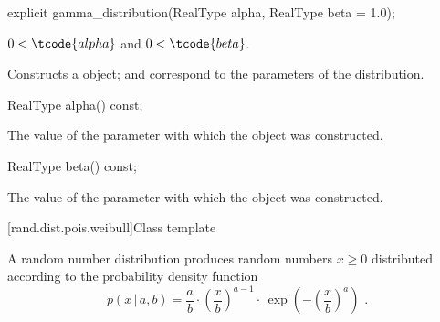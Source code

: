 %
\begin{itemdecl}
explicit gamma_distribution(RealType alpha, RealType beta = 1.0);
\end{itemdecl}

\begin{itemdescr}
\pnum
\requires $0 < \tcode{alpha}$ and $0 < \tcode{beta}$.

\pnum
\effects Constructs a  object;
 and 
correspond to the parameters of the distribution.
\end{itemdescr}

%
\begin{itemdecl}
RealType alpha() const;
\end{itemdecl}

\begin{itemdescr}
\pnum\returns The value of the  parameter
 with which the object was constructed.
\end{itemdescr}

%
\begin{itemdecl}
RealType beta() const;
\end{itemdecl}

\begin{itemdescr}
\pnum\returns The value of the  parameter
 with which the object was constructed.
\end{itemdescr}


[rand.dist.pois.weibull]{Class template }%
%
%

\pnum
A  random number distribution
produces random numbers $x \geq 0$
distributed according to
the probability density function%
%
%
\[ p(x\,|\,a,b) = \frac{a}{b}
     \cdot \left(\frac{x}{b}\right)^{a-1}
     \cdot \, \exp\left( -\left(\frac{x}{b}\right)^a\right)
     \text{ .} \]

